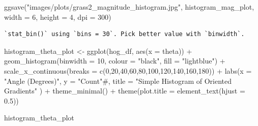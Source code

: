 \documentclass[
  letterpaper,
  DIV=11,
  numbers=noendperiod]{scrreprt}
\newenvironment{Shaded}{\begin{snugshade}}{\end{snugshade}}
\newcommand{\AttributeTok}[1]{\textcolor[rgb]{0.40,0.45,0.13}{#1}}
\newcommand{\CommentTok}[1]{\textcolor[rgb]{0.37,0.37,0.37}{#1}}
\newcommand{\DecValTok}[1]{\textcolor[rgb]{0.68,0.00,0.00}{#1}}
\newcommand{\FloatTok}[1]{\textcolor[rgb]{0.68,0.00,0.00}{#1}}
\newcommand{\FunctionTok}[1]{\textcolor[rgb]{0.28,0.35,0.67}{#1}}
\newcommand{\NormalTok}[1]{\textcolor[rgb]{0.00,0.23,0.31}{#1}}
\newcommand{\OtherTok}[1]{\textcolor[rgb]{0.00,0.23,0.31}{#1}}
\newcommand{\SpecialCharTok}[1]{\textcolor[rgb]{0.37,0.37,0.37}{#1}}
\newcommand{\StringTok}[1]{\textcolor[rgb]{0.13,0.47,0.30}{#1}}
\begin{document}
\begin{Shaded}
\begin{Highlighting}[]
\FunctionTok{ggsave}\NormalTok{(}\StringTok{"images/plots/grass2\_magnitude\_histogram.jpg"}\NormalTok{, histogram\_mag\_plot, }\AttributeTok{width =} \DecValTok{6}\NormalTok{, }\AttributeTok{height =} \DecValTok{4}\NormalTok{, }\AttributeTok{dpi =} \DecValTok{300}\NormalTok{)}
\end{Highlighting}
\end{Shaded}

\begin{verbatim}
`stat_bin()` using `bins = 30`. Pick better value with `binwidth`.
\end{verbatim}

\begin{Shaded}
\begin{Highlighting}[]
\NormalTok{histogram\_theta\_plot }\OtherTok{\textless{}{-}}
  \FunctionTok{ggplot}\NormalTok{(hog\_df, }\FunctionTok{aes}\NormalTok{(}\AttributeTok{x =}\NormalTok{ theta)) }\SpecialCharTok{+}
  \FunctionTok{geom\_histogram}\NormalTok{(}\AttributeTok{binwidth =} \DecValTok{10}\NormalTok{, }\AttributeTok{colour =} \StringTok{"black"}\NormalTok{, }\AttributeTok{fill =} \StringTok{"lightblue"}\NormalTok{) }\SpecialCharTok{+}
  \FunctionTok{scale\_x\_continuous}\NormalTok{(}\AttributeTok{breaks =} \FunctionTok{c}\NormalTok{(}\DecValTok{0}\NormalTok{,}\DecValTok{20}\NormalTok{,}\DecValTok{40}\NormalTok{,}\DecValTok{60}\NormalTok{,}\DecValTok{80}\NormalTok{,}\DecValTok{100}\NormalTok{,}\DecValTok{120}\NormalTok{,}\DecValTok{140}\NormalTok{,}\DecValTok{160}\NormalTok{,}\DecValTok{180}\NormalTok{)) }\SpecialCharTok{+} 
  \FunctionTok{labs}\NormalTok{(}\AttributeTok{x =} \StringTok{"Angle (Degrees)"}\NormalTok{, }\AttributeTok{y =} \StringTok{"Count"}\CommentTok{\#, title = "Simple Histogram of Oriented Gradients"}
\NormalTok{       ) }\SpecialCharTok{+}
  \FunctionTok{theme\_minimal}\NormalTok{() }\SpecialCharTok{+}
  \FunctionTok{theme}\NormalTok{(}\AttributeTok{plot.title =} \FunctionTok{element\_text}\NormalTok{(}\AttributeTok{hjust =} \FloatTok{0.5}\NormalTok{))}

\NormalTok{histogram\_theta\_plot}
\end{Highlighting}
\end{Shaded}
\end{document}
